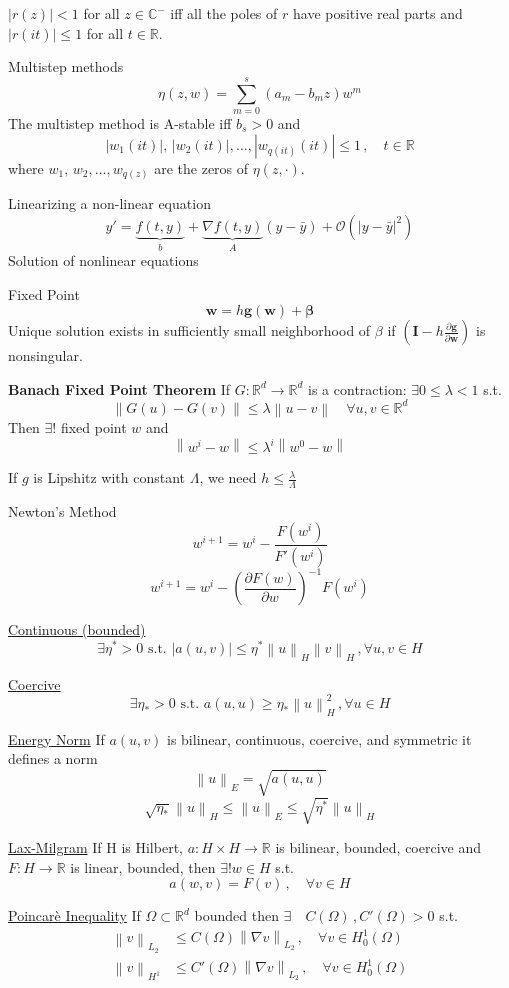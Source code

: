 \documentclass[letterpaper]{article}
\providecommand{\abs}[1]{\left\lvert#1\right\rvert}
\providecommand{\norm}[1]{\left\lVert#1\right\rVert}
\begin{document}
\begin{multicols}{2}
$\abs{r(z)}<1$ for all $z\in\mathbb{C}^-$ iff all the poles of $r$ have positive
real parts and $\abs{r(it)}\le 1$ for all $t\in\mathbb{R}$.

Multistep methods
\[
\eta(z,w)=\sum_{m=0}^s(a_m-b_mz)w^m
\]
The multistep method is A-stable iff $b_s>0$ and
\[
\abs{w_1(it)},\,\abs{w_2(it)},\dots,\abs{w_{q(it)}(it)}\le 1\,,\quad
t\in\mathbb{R}
\]
where $w_1,\,w_2,\dots,w_{q(z)}$ are the zeros of $\eta(z,\cdot)$.

Linearizing a non-linear equation
\[
y'=\underbrace{f(t,y)}_{b}+\underbrace{\nabla f(t,y)}_{A}(y-\bar y)
+\mathcal{O}(\abs{y-\bar y}^2)
\]
Solution of nonlinear equations

Fixed Point
\[
\mathbf{w}=h\mathbf{g}(\mathbf{w})+\boldsymbol\beta
\]
Unique solution exists in sufficiently small neighborhood of $\beta$ if
$\left(\mathbf{I}-h\frac{\partial\mathbf{g}}{\partial\mathbf{w}}\right)$ is
nonsingular.

\textbf{Banach Fixed Point Theorem}
If $G:\mathbb{R}^d\rightarrow\mathbb{R}^d$ is a contraction: $\exists
0\le\lambda<1$ s.t.
\[
\norm{G(u)-G(v)}\le\lambda\norm{u-v}\quad\forall u,v\in\mathbb{R}^d
\]
Then $\exists!$ fixed point $w$ and 
\[
\norm{w^i-w}\le\lambda^i\norm{w^0-w}
\]

If $g$ is Lipshitz with constant $\Lambda$, we need
$h\le\frac{\lambda}{\Lambda}$

Newton's Method
\[
w^{i+1}=w^i-\frac{F(w^i)}{F'(w^i)}
\]
\[
w^{i+1}=w^i-\left(\frac{\partial F(w)}{\partial w}\right)^{-1}F(w^i)
\]

\uline{Continuous (bounded)}
\[
\exists\eta^*>0\text{ s.t. }\abs{a(u,v)}\le\eta^*\norm{u}_H\norm{v}_H\,,\forall
u,v\in H
\]

\uline{Coercive}
\[
\exists\eta_*>0\text{ s.t. }a(u,u)\ge\eta_*\norm{u}_H^2\,,\forall u\in H
\]

\uline{Energy Norm}
If $a(u,v)$ is bilinear, continuous, coercive, and symmetric it defines a norm
\[
\norm{u}_E=\sqrt{a(u,u)}
\]
\[
\sqrt{\eta_*}\norm{u}_H\le\norm{u}_E\le\sqrt{\eta^*}\norm{u}_H
\]

\uline{Lax-Milgram}
If H is Hilbert,
$a:H\times H\rightarrow\mathbb{R}$ is bilinear, bounded, coercive
and $F:H\rightarrow\mathbb{R}$ is linear, bounded, then $\exists! w\in H$ s.t.
\[
a(w,v)=F(v)\,,\quad\forall v\in H
\]

\uline{Poincar\`e Inequality} If $\Omega\subset\mathbb{R}^d$ bounded then
$\exists\quad C(\Omega)\,,C'(\Omega)>0$ s.t.
\begin{align*}
\norm{v}_{L_2}&\le C(\Omega)\norm{\nabla v}_{L_2}\,,\quad\forall v\in
H_0^1(\Omega)\\
\norm{v}_{H^1}&\le C'(\Omega)\norm{\nabla v}_{L_2}\,,\quad\forall v\in
H_0^1(\Omega)
\end{align*}


\end{multicols}
\end{document}
